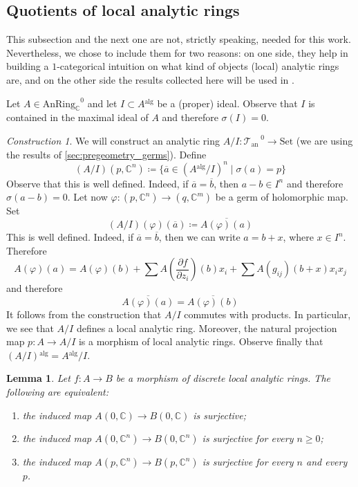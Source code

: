 \documentclass[12pt,a4paper,reqno]{amsart}
\theoremstyle{plain}
\newtheorem{lem}[thm]{Lemma}
\theoremstyle{definition}
\theoremstyle{remark}
\numberwithin{equation}{section}
\newtheorem{construction}[thm]{Construction}
\begin{document}
\subsection{Quotients of local analytic rings}

This subsection and the next one are not, strictly speaking, needed for this work.
Nevertheless, we chose to include them for two reasons: on one side, they help in building a $1$-categorical intuition on what kind of objects (local) analytic rings are, and on the other side the results collected here will be used in \cite{Porta_Analytic_deformation_2015}.

Let $A \in {\mathrm{AnRing}_{\mathbb C}}^0$ and let $I \subset A{^\mathrm{alg}}$ be a (proper) ideal.
Observe that $I$ is contained in the maximal ideal of $A$ and therefore $\sigma(I) = 0$.

\begin{construction}
	We will construct an analytic ring $A / I \colon {{{\mathcal T}_{\mathrm{an}}}^{\; \! 0}} \to {\mathrm{Set}}$ (we are using the results of \cref{sec:pregeometry_germs}).
	Define
	\[ (A/I)(p,\mathbb C^n) \coloneqq \{\overline{a} \in (A{^\mathrm{alg}} / I)^n \mid \sigma(a) = p\} \]
	Observe that this is well defined. Indeed, if $\overline{a} = \overline{b}$, then $a - b \in I^n$ and therefore $\sigma(a - b) = 0$.
	Let now $\varphi \colon (p, \mathbb C^n) \to (q, \mathbb C^m)$ be a germ of holomorphic map.
	Set
	\[ (A/I)(\varphi)(\overline{a}) \coloneqq \overline{A(\varphi)(a)} \]
	This is well defined. Indeed, if $\overline{a} = \overline{b}$, then we can write $a = b + x$, where $x \in I^n$.
	Therefore
	\[ A(\varphi)(a) = A(\varphi)(b) + \sum A \left( \frac{\partial f}{\partial z_i} \right)(b) x_i + \sum A(g_{ij})(b+x) x_i x_j \]
	and therefore
	\[ \overline{A(\varphi)(a)} = \overline{A(\varphi)(b)} \]
	It follows from the construction that $A/I$ commutes with products.
	In particular, we see that $A / I$ defines a local analytic ring.
	Moreover, the natural projection map $p \colon A \to A/I$ is a morphism of local analytic rings.
	Observe finally that $(A/I){^\mathrm{alg}} = A{^\mathrm{alg}} / I$.
\end{construction}

\begin{lem}
	Let $f \colon A \to B$ be a morphism of discrete local analytic rings.
	The following are equivalent:
	\begin{enumerate}
		\item the induced map $A(0, \mathbb C) \to B(0, \mathbb C)$ is surjective;
		\item the induced map $A(0, \mathbb C^n) \to B(0, \mathbb C^n)$ is surjective for every $n \ge 0$;
		\item the induced map $A(p, \mathbb C^n) \to B(p, \mathbb C^n)$ is surjective for every $n$ and every $p$.
	\end{enumerate}
\end{lem}
\end{document}
